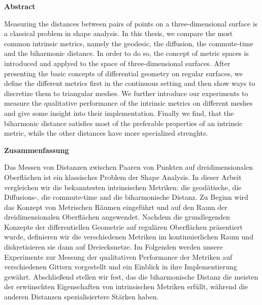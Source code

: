 

\clearemptydoublepage
{}
{}





\vspace*{2cm}
\begin{center}
{\Large \bfseries Abstract}
\end{center}
\vspace{1cm}

Measuring the distances between pairs of points on a three-dimensional surface is a classical problem in shape analysis.
In this thesis, we compare the most common intrinsic metrics, namely the geodesic, the diffusion, the commute-time and the biharmonic distance.
In order to do so, the concept of metric spaces is introduced and applyed to the space of three-dimensional surfaces.
After presenting the basic concepts of differential geometry on regular surfaces, we define the different metrics first in the continuous setting and then show ways to discretize them to triangular meshes.
We further introduce our experiments to measure the qualitative performance of the intrinsic metrics on different meshes and give some insight into their implementation.
Finally we find, that the biharmonic distance satisfies most of the preferable properties of an intrinsic metric, while the other distances have more specialized strenghts.

\vspace*{2cm}
\begin{center}
{\Large \bfseries Zusammenfassung}
\end{center}
\vspace{1cm}

Das Messen von Distanzen zwischen Paaren von Punkten auf dreidimensionalen Oberfl\"achen ist ein klassisches Problem der Shape Analysis.
In dieser Arbeit vergleichen wir die bekanntesten intrinsischen Metriken: die geod\"atische, die Diffusions-, die commute-time and die biharmonische Distanz.
Zu Beginn wird das Konzept von Metrischen R\"aumen eingef\"uhrt und auf den Raum der dreidimensionalen Oberfl\"achen angewendet.
Nachdem die grundlegenden Konzepte der differentiellen Geometrie auf regul\"aren Oberfl\"achen pr\"asentiert wurde, definieren wir die verschiedenen Metriken im kontinuierlichen Raum und diskretisieren sie dann auf Dreiecksnetze.
Im Folgenden werden unsere Experimente zur Messung der qualitativen Performance der Metriken auf verschiedenen Gittern vorgestellt und ein Einblick in ihre Implementierung gew\"ahrt.
Abschlie{\ss}end stellen wir fest, das die biharmonische Distanz die meisten der erw\"unschten Eigenschaften von intrinsischen Metriken erf\"ullt, w\"ahrend die anderen Distanzen spezialisiertere St\"arken haben.
